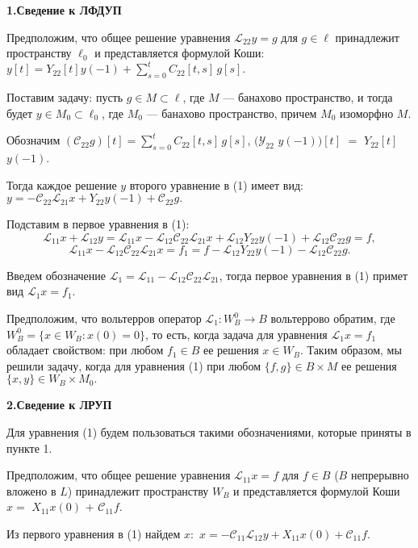 \smallskip \centerline {\bf 1.Сведение к ЛФДУП} \nopagebreak

Предположим, что общее решение уравнения ${\mathcal L}_{22} y=g$ для $g\in \ell $ принадлежит пространству $\ell _{0} $ и представляется формулой Коши:
$y[t]=Y_{22} [t]y(-1)+\sum\limits_{s=0}^{t}
 C_{22}  [t,s]\, g[s].$

Поставим задачу: пусть $g\in M\subset \ell $, где $M$ --- банахово пространство, и тогда будет $y\in M_{0} \subset \ell _{0} $, где $M_{0} $ --- банахово пространство, причем $M_{0} $ изоморфно $M$.

Обозначим $({\mathcal C}_{22} g)[t]=\sum\limits_{s=0}^{t}C_{22}  [t,s]\,g[s]$, $({\mathcal Y}_{22}$ $y(-1))[t]$ $=$ $Y_{22}[t]$$y(-1)$.

Тогда каждое решение $y$ второго уравнение в (1) имеет вид:
$y=-{\mathcal C}_{22} {\mathcal L}_{21} x+Y_{22} y(-1)+{\mathcal C}_{22} g.$

Подставим в первое уравнения в (1):
$${\mathcal L}_{11} x+{\mathcal L}_{12} y= {\mathcal L}_{11} x- {\mathcal L}_{12} {\mathcal C}_{22} {\mathcal L}_{21} x+{\mathcal L}_{12} Y_{22} y(-1)+ {\mathcal L}_{12} {\mathcal C}_{22} g=f,
$$
$$ {\mathcal L}_{11} x- {\mathcal L}_{12} {\mathcal C}_{22} {\mathcal L}_{21} x=f_{1} =f- {\mathcal L}_{12} Y_{22} y(-1)-{\mathcal L}_{ 12} {\mathcal C}_{22} g.
$$

Введем обозначение ${\mathcal L}_1= {\mathcal L}_{11} - {\mathcal L}_{12} {\mathcal C}_{22} {\mathcal L}_{21}$, тогда первое уравнения в (1) примет вид ${\mathcal L}_1x=f_{1}$.

Предположим, что вольтерров оператор ${\mathcal L}_1:W_{B}^{0} \to B$ вольтеррово обратим, где $W_{B}^{0} =\{ x\in W_{B} :x(0)=0\} $, то есть, когда задача для уравнения ${\mathcal L}_1x=f_{1} $ обладает свойством: при любом $f_{1} \in B$ ее решения $x\in W_{B} $. Таким образом, мы решили задачу, когда для уравнения (1) при любом $\{ f,g\} \in B\times M$ ее решения $\{ x,y\} \in W_{B} \times M_{0} .$



\smallskip \centerline {\bf 2.Сведение к ЛРУП} \nopagebreak


Для уравнения (1) будем пользоваться такими обозначениями, которые приняты в пункте 1.

Предположим, что общее решение уравнения ${\mathcal L}_{11} x=f$ для $f\in B$ ($B$ непрерывно вложено в $L$) принадлежит пространству $W_{B}$ и представляется формулой Коши $x =$ $X_{11}x(0)$ $+$ ${\mathcal C}_{11}f.$

Из первого уравнения в (1) найдем $x:$
$x=-{\mathcal C}_{11} {\mathcal L}_{12} y+X_{11} x(0)+{\mathcal C}_{11} f.$

